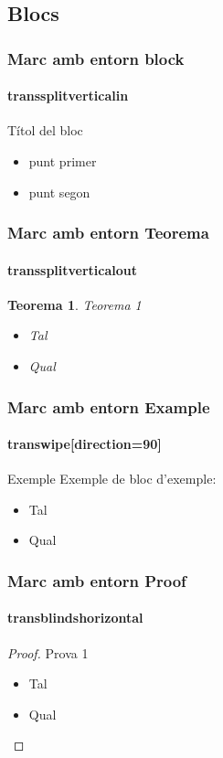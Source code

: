 \documentclass{beamer}
\newtheorem{teorema}[theorem]{Teorema}
\begin{document}
\subsection{Blocs}
\begin{frame}
  \frametitle{Marc amb entorn block}
  \framesubtitle{transsplitverticalin}
  \begin{block}{Títol del bloc}
				\begin{itemize}
					\item punt primer
					\item punt segon
				\end{itemize}
	\end{block} 

	\transsplitverticalin
	
\end{frame}
\begin{frame}
  \frametitle{Marc amb entorn Teorema}
  \framesubtitle{transsplitverticalout}
  \begin{teorema}{Teorema 1}
				\begin{itemize}
					\item Tal
					\item Qual
				\end{itemize}
\end{teorema} 
 	\transsplitverticalout
	

\end{frame}
\begin{frame}
  \frametitle{Marc amb entorn Example}
  \framesubtitle{transwipe[direction=90]}

\begin{exampleblock}{Exemple}
Exemple de bloc d'exemple:
   \begin{itemize}
	\item Tal
	\item Qual
   \end{itemize}
\end{exampleblock}

\transwipe[direction=90]

\end{frame}
\begin{frame}
  \frametitle{Marc amb entorn Proof}
    \framesubtitle{transblindshorizontal}

  \begin{proof}{Prova 1}
				\begin{itemize}
					\item Tal
					\item Qual
				\end{itemize}
\end{proof} 
\transblindshorizontal
\end{frame}
\end{document}
